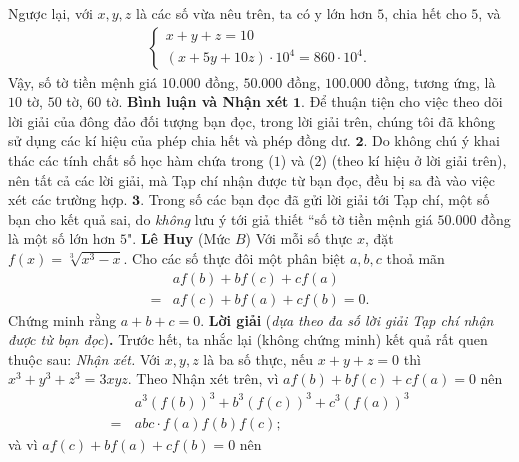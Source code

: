 \begin{multicols}{2}
	\vskip 0.05cm
	Ngược lại, với $x, y, z$ là các số vừa nêu trên, ta có y lớn hơn $5$, chia hết cho $5$, và
	\begin{align*}
		\begin{cases}
			x + y + z = 10\\
			(x + 5y + 10z) \cdot 10^4 = 860 \cdot 10^4.
		\end{cases}
	\end{align*}
	Vậy, số tờ tiền mệnh giá $10{.}000$ đồng, $50{.}000$ đồng, $100{.}000$ đồng, tương ứng, là $10$ tờ, $50$ tờ, $60$ tờ.
	\vskip 0.05cm
	\textbf{\color{thachthuctoanhoc}Bình luận và Nhận xét}
	\vskip 0.05cm	
	$\pmb{1.}$ Để thuận tiện cho việc theo dõi lời giải của đông đảo đối tượng bạn đọc, trong lời giải trên, chúng tôi đã không sử dụng các kí hiệu của phép chia hết và phép đồng dư.
	\vskip 0.05cm
	$\pmb{2.}$ Do không chú ý khai thác các tính chất số học hàm chứa trong ($1$) và ($2$) (theo kí hiệu ở lời giải trên), nên tất cả các lời giải, mà Tạp chí nhận được từ bạn đọc, đều bị sa đà vào việc xét các trường hợp.
	\vskip 0.05cm
	$\pmb{3.}$ Trong số các bạn đọc đã gửi lời giải tới Tạp chí, một số bạn cho kết quả sai, do \textit{không} lưu ý tới giả thiết ``số tờ tiền mệnh giá $50{.}000$ đồng là một số lớn hơn $5$".
	\vskip 0.05cm
	\hfill	\textbf{\color{thachthuctoanhoc}Lê Huy}
	\vskip 0.05cm
	{}
	(Mức $B$) Với mỗi số thực $x$, đặt $f(x)=\sqrt[3]{x^3-x}$. Cho các số thực đôi một phân biệt $a,b,c$ thoả mãn
	\begin{align*}
		&a f(b)+b f(c)+c f(a)\\
		=&a f(c)+b f(a)+c f(b)=0.
	\end{align*}
	Chứng minh rằng $a+b+c=0$. 
	\vskip 0.05cm
	\textbf{\color{thachthuctoanhoc}Lời giải} (\textit{dựa theo đa số lời giải Tạp chí nhận được từ bạn đọc})\textbf{\color{thachthuctoanhoc}.}
	\vskip 0.05cm
	Trước hết, ta nhắc lại (không chứng minh) kết quả rất quen thuộc sau:
	\vskip 0.05cm
	\textit{Nhận xét.} Với $x, y, z$ là ba số thực, nếu $x + y + z = 0$ thì ${x^3} + {y^3} + {z^3} = 3xyz.$   
	\vskip 0.05cm
	Theo Nhận xét trên, vì $af\left( b \right) + bf\left( c \right) + cf\left( a \right) = 0$  nên
	\begin{align*}
		&{a^3}{\left( {f\left( b \right)} \right)^3} + {b^3}{\left( {f\left( c \right)} \right)^3} + {c^3}{\left( {f\left( a \right)} \right)^3} \\
		= \,&abc \cdot f\left( a \right)f\left( b \right)f\left( c \right);
	\end{align*}
	và vì $af\left( c \right) + bf\left( a \right) + cf\left( b \right) = 0$  nên 

\end{multicols}
